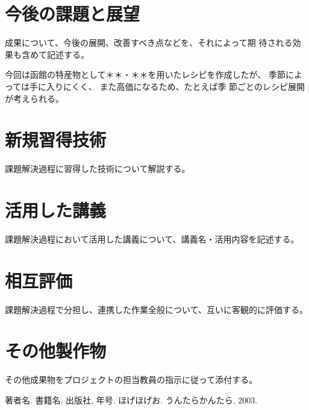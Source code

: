 \documentclass[openany,11pt,papersize]{jsbook}
\begin{document}



\chapter{今後の課題と展望}
\begin{hissu}
成果について、今後の展開、改善すべき点などを、それによって期
待される効果も含めて記述する。
\end{hissu}

今回は函館の特産物として＊＊・＊＊を用いたレシピを作成したが、
季節によっては手に入りにくく、 また高価になるため、たとえば季
節ごとのレシピ展開が考えられる。 


\begin{appendix}

\chapter{新規習得技術}
\begin{hissu}
課題解決過程に習得した技術について解説する。
\end{hissu}

\chapter{活用した講義}
\begin{hissu}
課題解決過程において活用した講義について、講義名・活用内容を記述する。 
\end{hissu}

\chapter{相互評価}
\begin{hissu}
課題解決過程で分担し、連携した作業全般について、互いに客観的に評価する。 
\end{hissu}

\chapter{その他製作物}
\begin{hissu}
その他成果物をプロジェクトの担当教員の指示に従って添付する。
\end{hissu}

\end{appendix}



\begin{thebibliography}{9}
  著者名. 書籍名. 出版社,  年号.
  ほげほげお. うんたらかんたら,  2003.
\end{thebibliography}
\end{document}
